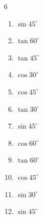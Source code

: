 \begin{multicols}{6}
\begin{enumerate}

  \item $\displaystyle \sin{45^\circ}$


  \item $\displaystyle \tan{60^\circ}$


  \item $\displaystyle \tan{45^\circ}$

        \phantom{$\displaystyle =1$}

  \item $\displaystyle \cos{30^\circ}$


  \item $\displaystyle \cos{45^\circ}$


  \item $\displaystyle \tan{30^\circ}$


  \item $\displaystyle \sin{45^\circ}$


  \item $\displaystyle \cos{60^\circ}$


  \item $\displaystyle \tan{60^\circ}$


  \item $\displaystyle \cos{45^\circ}$


  \item $\displaystyle \sin{30^\circ}$


  \item $\displaystyle \sin{45^\circ}$



\end{enumerate}
\end{multicols}
